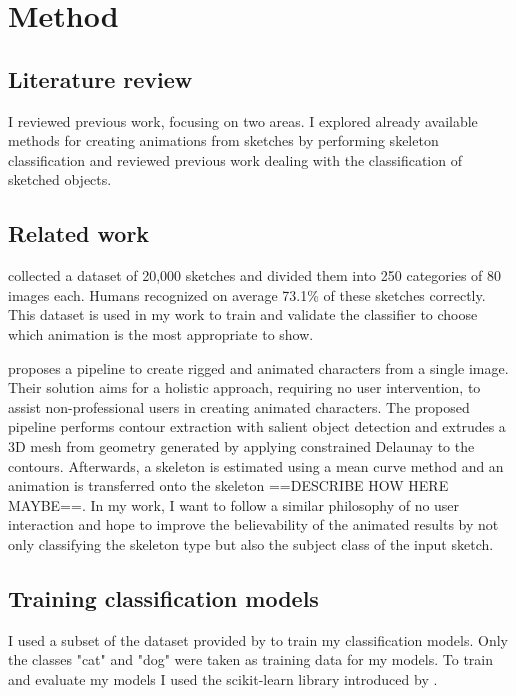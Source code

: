 \chapter{Method}
\label{ch:method}

\section*{Literature review}
I reviewed previous work, focusing on two areas. I explored already available
methods for creating animations from sketches by performing skeleton
classification and reviewed previous work dealing with the classification of
sketched objects.

\section*{Related work}
\textcite{eitz2012hdhso} collected a dataset of 20,000 sketches and divided them
into 250 categories of 80 images each. Humans recognized on average 73.1\% of 
these sketches correctly. This dataset is used in my work to train and validate
the classifier to choose which animation is the most appropriate to show.

\textcite{10.1145/3469877.3490565} proposes a pipeline to create rigged and
animated characters from a single image. Their solution aims for a holistic
approach, requiring no user intervention, to assist non-professional users in
creating animated characters. The proposed pipeline performs contour extraction
with salient object detection and extrudes a 3D mesh from geometry generated by
applying constrained Delaunay to the contours. Afterwards, a skeleton is
estimated using a mean curve method and an animation is transferred onto the
skeleton ==DESCRIBE HOW HERE MAYBE==. In my work, I want to follow a similar
philosophy of no user interaction and hope to improve the believability of the
animated results by not only classifying the skeleton type but also the subject
class of the input sketch.

\section*{Training classification models}
I used a subset of the dataset provided by \textcite{eitz2012hdhso} to
train my classification models. Only the classes "cat" and "dog" were taken as
training data for my models. To train and evaluate my models I used the
scikit-learn library introduced by \textcite{scikit-learn}.

